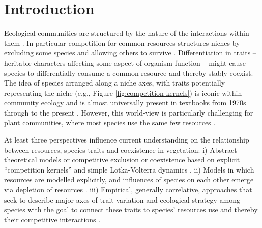 \documentclass[a4paper,11pt]{article}
\begin{document}
\section{Introduction}

Ecological communities are structured by the nature of the
interactions within them \citep{Schluter-2000}.
In particular competition for common resources structures niches by
excluding some species and allowing others to survive
\citep[e.g.][]{Gause-1934,Lack-1947,MacArthur-1967}.
%
Differentiation in traits -- heritable characters affecting some aspect
of organism function -- might cause species to differentially consume
a common resource and thereby stably coexist.
The idea of species arranged along a niche axes, with traits potentially
representing the niche (e.g., Figure
\ref{fig:competition-kernels}) is iconic within community ecology and
is almost universally present in textbooks from 1970s through to the
present \citep[e.g.,][]{Krebs-1972, Ricklefs-1973, Ricklefs-1999,
  Krebs-2013}.
%
However, this world-view is particularly challenging for plant
communities, where most species use the same few resources
\citep[e.g.,][]{Whittaker-1970, Grime-1979, Hubbell-2001,
  Westoby-2002}.

At least three perspectives influence current understanding on
the relationship between resources, species traits and coexistence
in vegetation:
i) Abstract theoretical models or competitive exclusion or coexistence based on explicit ``competition kernels'' and simple Lotka-Volterra dynamics
\citep[e.g.][]{MacArthur-1967,Case-1982,Dieckmann-1999,Leimar-2013}.
%
ii) Models in which resources are modelled explicitly, and influences of species
on each other emerge via depletion of resources
\citep[e.g.][]{Tilman-1977, Huston-1987, Kohyama-1993, Falster-2011}.
%
iii) Empirical, generally correlative, approaches that seek to
describe major axes of trait variation and ecological strategy among
species with the goal to connect these traits to species' resources use and thereby their
competitive interactions
\citep[e.g.][]{Grime-1979, Weiher-1999, Westoby-2002}.


\end{document}
